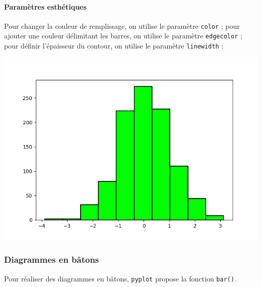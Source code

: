 \documentclass[12pt,]{book}
\newenvironment{Shaded}{\begin{snugshade}}{\end{snugshade}}
\newcommand{\DecValTok}[1]{\textcolor[rgb]{0.00,0.00,0.81}{#1}}
\newcommand{\FloatTok}[1]{\textcolor[rgb]{0.00,0.00,0.81}{#1}}
\newcommand{\StringTok}[1]{\textcolor[rgb]{0.31,0.60,0.02}{#1}}
\newcommand{\OperatorTok}[1]{\textcolor[rgb]{0.81,0.36,0.00}{\textbf{#1}}}
\newcommand{\NormalTok}[1]{#1}
\let\oldparagraph\paragraph
\renewcommand{\paragraph}[1]{\oldparagraph{#1}\mbox{}}
\numberwithin{equation}{section}
\numberwithin{countremarque}{section}
\begin{document}
\paragraph{Paramètres esthétiques}\label{parametres-esthetiques-1}

Pour changer la couleur de remplissage, on utilise le paramètre
\texttt{color} ; pour ajouter une couleur délimitant les barres, on
utilise le paramètre \texttt{edgecolor} ; pour définir l'épaisseur du
contour, on utilise le paramètre \texttt{linewidth} :

\begin{Shaded}
\end{Shaded}

\begin{center}\includegraphics[width=9.03in]{figs/pyplot/histogramme_esthetiques} \end{center}

\subsubsection{Diagrammes en bâtons}\label{diagrammes-en-batons}

Pour réaliser des diagrammes en bâtons, \texttt{pyplot} propose la
fonction \texttt{bar()}.
\end{document}

